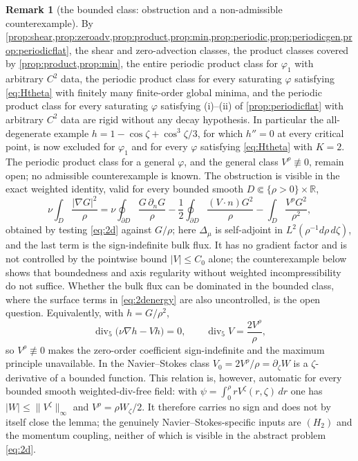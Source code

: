 \documentclass[11pt]{article}
\theoremstyle{definition}
\newtheorem{remark}[theorem]{Remark}
\newcommand{\R}{\mathbb{R}}
\newcommand{\Div}{\operatorname{div}}
\newcommand{\grad}{\nabla}
\begin{document}
\begin{remark}[the bounded class: obstruction and a non-admissible counterexample]\label{rem:2dopen}
By \cref{prop:shear,prop:zeroadv,prop:product,prop:min,prop:periodic,prop:periodicgen,prop:periodicflat},
the shear and zero-advection classes, the product classes covered by
\cref{prop:product,prop:min}, the entire periodic product class for
$\varphi_1$ with arbitrary $C^2$ data, the periodic product class for every
saturating $\varphi$ satisfying \eqref{eq:Htheta} with finitely many
finite-order global minima, and the periodic product class for every
saturating $\varphi$ satisfying (i)--(ii) of \cref{prop:periodicflat} with
arbitrary $C^2$ data are rigid
without any decay hypothesis. In particular the all-degenerate example
$h=1-\cos\zeta+\cos^3\zeta/3$, for which $h''=0$ at every critical point, is
now excluded for $\varphi_1$ and for every $\varphi$ satisfying
\eqref{eq:Htheta} with $K=2$. The periodic product class for a general
$\varphi$, and the general class $V^\rho\not\equiv0$, remain open; no
admissible counterexample is known.
The obstruction is visible in the exact weighted identity, valid for every
bounded smooth $D\Subset\{\rho>0\}\times\R$,
\begin{equation}\label{eq:2denergy}
\nu\int_D\frac{|\grad G|^2}{\rho}
=\nu\oint_{\partial D}\frac{G\,\partial_nG}{\rho}
-\frac12\oint_{\partial D}\frac{(V\cdot n)G^2}{\rho}
-\int_D\frac{V^\rho G^2}{\rho^2},
\end{equation}
obtained by testing \eqref{eq:2d} against $G/\rho$; here $\Delta_\mu$ is
self-adjoint in $L^2(\rho^{-1}d\rho\,d\zeta)$, and the last term is the
sign-indefinite bulk flux. It has no gradient factor and is not controlled by
the pointwise bound $|V|\le C_0$ alone; the counterexample below shows that
boundedness and axis regularity without weighted incompressibility do not
suffice. Whether the bulk flux can be dominated in the bounded class, where
the surface terms in \eqref{eq:2denergy} are also uncontrolled, is the open
question. Equivalently, with
$h=G/\rho^2$,
\begin{equation}\label{eq:2dlift}
\Div_5\bigl(\nu\grad h-Vh\bigr)=0,\qquad
\Div_5V=\frac{2V^\rho}{\rho},
\end{equation}
so $V^\rho\not\equiv0$ makes the zero-order coefficient sign-indefinite and
the maximum principle unavailable. In the Navier--Stokes class
$V_0=2V^\rho/\rho=\partial_\zeta W$ is a $\zeta$-derivative of a bounded
function. This relation is, however, automatic for every
bounded smooth weighted-div-free field: with
$\psi=\int_0^\rho rV^\zeta(r,\zeta)\,dr$ one has
$|W|\le\|V^\zeta\|_\infty$ and $V^\rho=\rho W_\zeta/2$. It therefore carries
no sign and does not by itself close the lemma; the genuinely
Navier--Stokes-specific inputs are $(H_2)$ and the momentum coupling, neither
of which is visible in the abstract problem \eqref{eq:2d}.


\end{remark}
\end{document}
